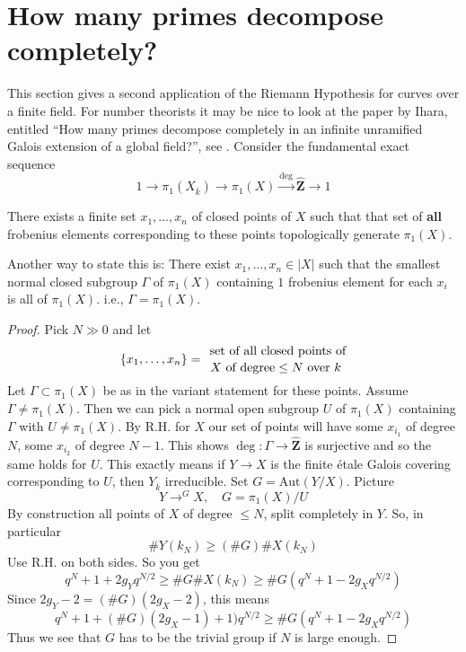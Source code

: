 \section{How many primes decompose completely?}
\label{section-how-many}

\noindent
This section gives a second application of the Riemann Hypothesis for
curves over a finite field. For number theorists it may be nice
to look at the paper by Ihara, entitled
``How many primes decompose completely in an infinite unramified Galois
extension of a global field?'', see \cite{Ihara}.
Consider the fundamental exact sequence
$$
1 \to
\pi_1(X_{\overline{k}}) \to
\pi_1(X) \xrightarrow{\deg}
\widehat{\mathbf{Z}} \to 1
$$

\begin{proposition}
\label{proposition-finite-set-frobenii-generate-topologically}
There exists a finite set $x_1, \ldots, x_n$ of closed points of $X$
such that that set of {\bf all} frobenius elements corresponding to these
points topologically generate $\pi_1(X)$.
\end{proposition}

\noindent
Another way to state this is:
There exist $x_1, \ldots, x_n\in |X|$ such that
the smallest normal closed subgroup $\Gamma$ of $\pi_1(X)$
containing $1$ frobenius element for each $x_i$ is all of $\pi_1(X)$. i.e.,
$\Gamma = \pi_1(X)$.

\begin{proof}
Pick $N\gg 0$ and let
$$
\{x_1, \ldots, x_n\} =
{\text{ set of all closed points of}
\atop X \text{ of degree} \leq N\text{ over } k}
$$
Let $\Gamma\subset \pi_1(X)$ be as in the variant statement for these
points. Assume $\Gamma \neq \pi_1(X)$. Then we can pick a normal open
subgroup $U$ of $\pi_1(X)$ containing $\Gamma$ with
$U \neq \pi_1(X)$. By R.H. for $X$ our set of points will have some
$x_{i_1}$ of degree $N$, some $x_{i_2}$ of degree $N - 1$. This shows
$\deg : \Gamma \to \widehat{\mathbf{Z}}$ is surjective
and so the same holds for $U$. This exactly
means if $Y \to X$ is the finite \'etale Galois covering
corresponding to $U$, then $Y_{\overline{k}}$ irreducible.
Set $G = \text{Aut}(Y/X)$. Picture
$$
Y \to^G X,\quad G = \pi_1(X)/U
$$
By construction all points of $X$ of degree $\leq N$, split
completely in $Y$. So, in particular
$$
\# Y(k_N)\geq (\# G)\# X(k_N)
$$
Use R.H. on both sides. So you get
$$
q^N+1+2g_Yq^{N/2}\geq \# G\# X(k_N)\geq \#
G(q^N+1-2g_Xq^{N/2})
$$
Since $2g_Y-2 = (\# G)(2g_X-2)$, this means
$$
q^N + 1 + (\# G)(2g_X - 1) + 1)q^{N/2}\geq
\# G (q^N + 1 - 2g_Xq^{N/2})
$$
Thus we see that $G$ has to be the trivial group if $N$ is large enough.
\end{proof}

